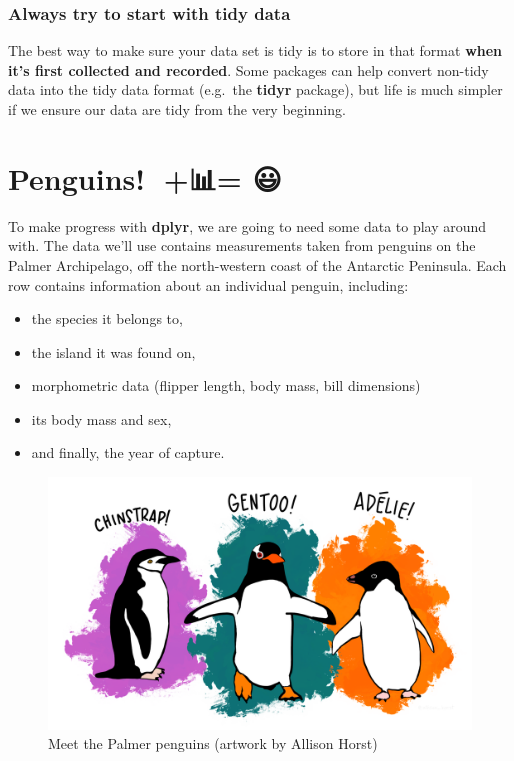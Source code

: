 \documentclass[
]{book}
\providecommand{\tightlist}{%
  \setlength{\itemsep}{0pt}\setlength{\parskip}{0pt}}
\newenvironment{greybox}{
  \definecolor{shadecolor}{rgb}{0.95,0.95,0.95}  %
  \color{black}
  \begin{shaded}}
 {\end{shaded}}
\newenvironment{infobox}[1]
  {
  \begin{itemize}
  \renewcommand{\labelitemi}{
    \raisebox{-.7\height}[0pt][0pt]{
      {\setkeys{Gin}{width=3em,keepaspectratio}
        \texttt{[image: images/\#1]}}
    }
  }
  \setlength{\fboxsep}{1em}
  \begin{greybox}
  \item
  }
  {
  \end{greybox}
  \end{itemize}
  }
\begin{document}
\begin{infobox}{warning}

\hypertarget{always-try-to-start-with-tidy-data}{%
\subsubsection*{Always try to start with tidy data}\label{always-try-to-start-with-tidy-data}}

The best way to make sure your data set is tidy is to store in that format \textbf{when it's first collected and recorded}. Some packages can help convert non-tidy data into the tidy data format (e.g.~the \textbf{tidyr} package), but life is much simpler if we ensure our data are tidy from the very beginning.

\end{infobox}

\hypertarget{penguins-data-overview}{%
\section{Penguins! 🐧+📊= 😃}\label{penguins-data-overview}}

To make progress with \textbf{dplyr}, we are going to need some data to play around with. The data we'll use contains measurements taken from penguins on the Palmer Archipelago, off the north-western coast of the Antarctic Peninsula. Each row contains information about an individual penguin, including:

\begin{itemize}
\tightlist
\item
  the species it belongs to,
\item
  the island it was found on,
\item
  morphometric data (flipper length, body mass, bill dimensions)
\item
  its body mass and sex,
\item
  and finally, the year of capture.
\end{itemize}

\begin{figure}

{\centering \includegraphics[width=0.75\linewidth]{./images/lter_penguins} 

}

\caption{Meet the Palmer penguins (artwork by Allison Horst)}\label{fig:unnamed-chunk-102}
\end{figure}
\end{document}
